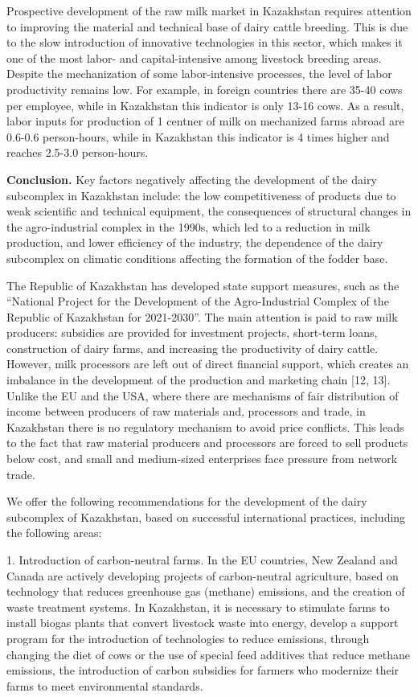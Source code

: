 \begin{multicols}{2}
Prospective development of the raw milk market in Kazakhstan requires
attention to improving the material and technical base of dairy cattle
breeding. This is due to the slow introduction of innovative
technologies in this sector, which makes it one of the most labor- and
capital-intensive among livestock breeding areas. Despite the
mechanization of some labor-intensive processes, the level of labor
productivity remains low. For example, in foreign countries there are
35-40 cows per employee, while in Kazakhstan this indicator is only
13-16 cows. As a result, labor inputs for production of 1 centner of
milk on mechanized farms abroad are 0.6-0.6 person-hours, while in
Kazakhstan this indicator is 4 times higher and reaches 2.5-3.0
person-hours.

{\bfseries Conclusion.} Key factors negatively affecting the development of
the dairy subcomplex in Kazakhstan include: the low competitiveness of
products due to weak scientific and technical equipment, the
consequences of structural changes in the agro-industrial complex in the
1990s, which led to a reduction in milk production, and lower efficiency
of the industry, the dependence of the dairy subcomplex on climatic
conditions affecting the formation of the fodder base.

The Republic of Kazakhstan has developed state support measures, such as
the ``National Project for the Development of the Agro-Industrial
Complex of the Republic of Kazakhstan for 2021-2030''. The main
attention is paid to raw milk producers: subsidies are provided for
investment projects, short-term loans, construction of dairy farms, and
increasing the productivity of dairy cattle. However, milk processors
are left out of direct financial support, which creates an imbalance in
the development of the production and marketing chain {[}12, 13{]}.
Unlike the EU and the USA, where there are mechanisms of fair
distribution of income between producers of raw materials and,
processors and trade, in Kazakhstan there is no regulatory mechanism to
avoid price conflicts. This leads to the fact that raw material
producers and processors are forced to sell products below cost, and
small and medium-sized enterprises face pressure from network trade.

We offer the following recommendations for the development of the dairy
subcomplex of Kazakhstan, based on successful international practices,
including the following areas:

1. Introduction of carbon-neutral farms. In the EU countries, New Zealand
and Canada are actively developing projects of carbon-neutral
agriculture, based on technology that reduces greenhouse gas (methane)
emissions, and the creation of waste treatment systems. In Kazakhstan,
it is necessary to stimulate farms to install biogas plants that
convert livestock waste into energy, develop a support program for the
introduction of technologies to reduce emissions, through changing the
diet of cows or the use of special feed additives that reduce methane
emissions, the introduction of carbon subsidies for farmers who
modernize their farms to meet environmental standards.


\end{multicols}
